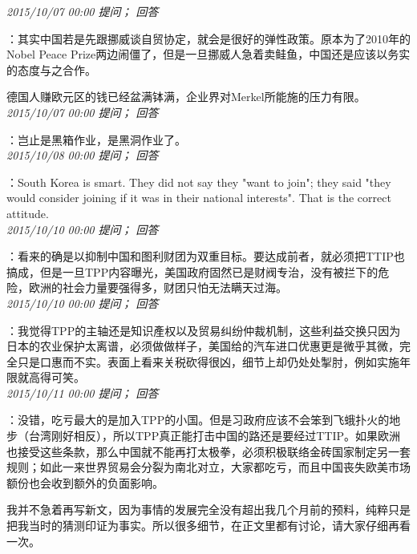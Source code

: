 \documentclass[twocolumn]{ctexart}
\begin{document}
\textit{\hfill\noindent\small 2015/10/07 00:00 提问； 回答}

：其实中国若是先跟挪威谈自贸协定，就会是很好的弹性政策。原本为了2010年的Nobel Peace Prize两边闹僵了，但是一旦挪威人急着卖鲑鱼，中国还是应该以务实的态度与之合作。

德国人赚欧元区的钱已经盆满钵满，企业界对Merkel所能施的压力有限。\\

\textit{\hfill\noindent\small 2015/10/07 00:00 提问； 回答}

：岂止是黑箱作业，是黑洞作业了。\\

\textit{\hfill\noindent\small 2015/10/08 00:00 提问； 回答}

：South Korea is smart. They did not say they "want to join"; they said "they would consider joining if it was in their national interests". That is the correct attitude.\\

\textit{\hfill\noindent\small 2015/10/10 00:00 提问； 回答}

：看来的确是以抑制中国和图利财团为双重目标。要达成前者，就必须把TTIP也搞成，但是一旦TPP内容曝光，美国政府固然已是财阀专治，没有被拦下的危险，欧洲的社会力量要强得多，财团只怕无法瞒天过海。\\

\textit{\hfill\noindent\small 2015/10/10 00:00 提问； 回答}

：我觉得TPP的主轴还是知识產权以及贸易纠纷仲裁机制，这些利益交换只因为日本的农业保护太离谱，必须做做样子，美国给的汽车进口优惠更是微乎其微，完全只是口惠而不实。表面上看来关税砍得很凶，细节上却仍处处掣肘，例如实施年限就高得可笑。\\

\textit{\hfill\noindent\small 2015/10/11 00:00 提问； 回答}

：没错，吃亏最大的是加入TPP的小国。但是习政府应该不会笨到飞蛾扑火的地步（台湾刚好相反），所以TPP真正能打击中国的路还是要经过TTIP。如果欧洲也接受这些条款，那么中国就不能再打太极拳，必须积极联络金砖国家制定另一套规则；如此一来世界贸易会分裂为南北对立，大家都吃亏，而且中国丧失欧美市场额份也会收到额外的负面影响。

我并不急着再写新文，因为事情的发展完全没有超出我几个月前的预料，纯粹只是把我当时的猜测印证为事实。所以很多细节，在正文里都有讨论，请大家仔细再看一次。\\
\end{document}
